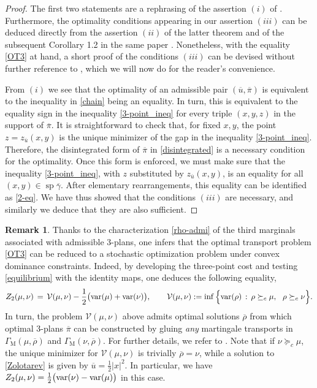 \documentclass[11pt,reqno]{amsart}
\theoremstyle{definition}
\newtheorem{remark}[theorem]{Remark}
\numberwithin{equation}{section}
\newcommand{\ov}{\overline}
\newcommand{\var}{{\rm{var}}}
\newcommand{\V}{{\mathcal{V}}}
\DeclareMathOperator{\spt}{sp}
\begin{document}
\begin{proof} The first two statements are a rephrasing of the assertion $(i)$ of  \cite[Theorem 1.1]{bolbou2024}. Furthermore, the optimality conditions appearing in our  assertion $(iii)$ can be  deduced directly from  the assertion $(ii)$ of the latter theorem and of the subsequent Corollary 1.2 in the same paper \cite{bolbou2024}.
Nonetheless, with the equality \eqref{OT3} at hand, a short proof of the conditions $(iii)$ can be devised without further reference to \cite{bolbou2024}, which we will now do for the reader's convenience.

From $(i)$ we see that the optimality of an admissible pair $(\ov{u},\ov{\pi})$ is equivalent to the inequality in \eqref{chain} being an equality. In turn, this is equivalent to the equality sign in the inequality \eqref{3-point_ineq} for every triple $(x,y,z)$ in the support of $\ov\pi$. It is straightforward to check that, for fixed $x,y$, the point $z = z_{\ov{u}}(x,y)$ is the unique minimizer of the gap in the inequality \eqref{3-point_ineq}. Therefore, the disintegrated form of $\ov\pi$ in \eqref{disintegrated} is a necessary condition for the optimality. Once this form is enforced, we must make sure that the inequality \eqref{3-point_ineq}, with $z$ substituted by $z_{\ov u}(x,y)$, is an equality for all  $(x,y) \in \spt\ov\gamma$. After elementary rearrangements, this equality can be identified as \eqref{2-eq}. We have thus showed that the conditions $(iii)$ are necessary, and similarly we deduce that they are also sufficient.
\end{proof}

\begin{remark} \label{stochastic-opt} Thanks to the characterization \eqref{rho-admi} of the third marginals associated with  admissible 3-plans, one infers that the optimal transport problem \eqref{OT3} can be reduced to a stochastic optimization problem under convex dominance constraints. Indeed, by developing the three-point cost and  testing  \eqref{equilibrium} with the identity maps, one deduces  the following equality,
$$ Z_2(\mu,\nu) \, =\, \V(\mu,\nu) - \frac1{2} \big(\var (\mu) +\var (\nu) \big), \qquad \V(\mu,\nu):= \inf \Big\{ \var (\rho) \, :\, \rho  \succeq_c \mu, \ \  \rho  \succeq_c \nu \Big\}.$$
In turn, the problem  $\V(\mu,\nu)$ above admits optimal solutions $\ov\rho$ from which optimal 3-plans $\ov\pi$ can be constructed by gluing \textit{any} martingale transports in $\Gamma_{\mathrm{M}}(\mu,\ov\rho)$ and $\Gamma_{\mathrm{M}}(\nu,\ov\rho)$.
For further details, we refer to \cite{bolbou2024}. 
Note that if $\nu  \succeq_c \mu$, the unique minimizer for $\V(\mu,\nu)$ is trivially  $\ov\rho=\nu$, while a solution to \eqref{Zolotarev} is given by $\ov u= \frac1{2} |x|^2$. In particular, we have $Z_2(\mu,\nu) = \frac1{2} \big(\var (\nu) -\var (\mu) \big)$ in this case.
 
\end{remark}
\end{document}
